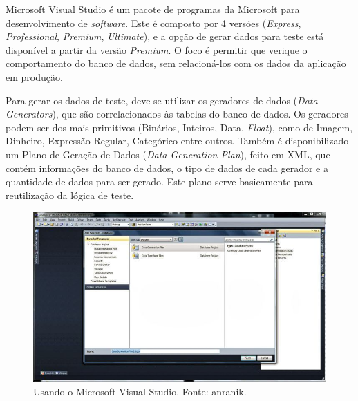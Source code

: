 \documentclass[
	12pt,				%
	openright,			%
	twoside,			%
	a4paper,			%
	english,			%
	brazil				%
	]{abntex2}
\begin{document}
			Microsoft Visual Studio \cite{VSDataGenerator} é um pacote de programas da Microsoft para desenvolvimento de \emph{software}. 
			Este é composto por 4 versões (\emph{Express}, \emph{Professional}, \emph{Premium}, \emph{Ultimate}), e a opção de gerar dados para teste está disponível a partir da versão \emph{Premium}.
			O foco é permitir que verique o comportamento do banco de dados, sem relacioná-los com os dados da aplicação em produção.
			\par
			Para gerar os dados de teste, deve-se utilizar os geradores de dados (\emph{Data Generators}), que são correlacionados às tabelas do banco de dados.
				Os geradores podem ser dos mais primitivos (Binários, Inteiros, Data, \emph{Float}), como de Imagem, Dinheiro, Expressão Regular, Categórico entre outros.
			Também é disponibilizado um Plano de Geração de Dados (\emph{Data Generation Plan}), feito em XML, que contém informações do banco de dados, o tipo de dados de cada gerador e a quantidade de dados para ser gerado. 
			Este plano serve basicamente para reutilização da lógica de teste.
			\begin{figure}[h]
				\centering
				\includegraphics[width=\linewidth]{./figures/TrabalhosRelacionados/Visual-Studio.jpg}
				\caption{Usando o Microsoft Visual Studio. Fonte: anranik.}
				\label{fig:VSDG}
			\end{figure}
\end{document}
